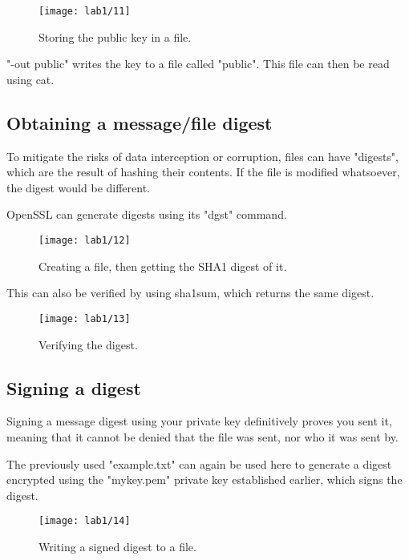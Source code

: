 \begin{figure}[H]
    \centering
    \texttt{[image: lab1/11]}
    \caption{Storing the public key in a file.}
    \label{fig:pubKeyFile}
\end{figure}

"-out public" writes the key to a file called "public".
This file can then be read using cat.

\pagebreak

\subsection{Obtaining a message/file digest}\label{subsec:hashDigest}
To mitigate the risks of data interception or corruption, files can have "digests", which are the result
of hashing their contents.
If the file is modified whatsoever, the digest would be different.\newline

OpenSSL can generate digests using its "dgst" command.
\begin{figure}[H]
    \centering
    \texttt{[image: lab1/12]}
    \caption{Creating a file, then getting the SHA1 digest of it.}
    \label{fig:digest}
\end{figure}

This can also be verified by using sha1sum, which returns the same digest.

\begin{figure}[H]
    \centering
    \texttt{[image: lab1/13]}
    \caption{Verifying the digest.}
    \label{fig:digestVerify}
\end{figure}

\pagebreak

\subsection{Signing a digest}\label{subsec:SignDigest}
Signing a message digest using your private key definitively proves you sent it,
meaning that it cannot be denied that the file was sent, nor who it was sent by.

The previously used "example.txt" can again be used here to generate a digest encrypted using the "mykey.pem"
private key established earlier, which signs the digest.

\begin{figure}[H]
    \centering
    \texttt{[image: lab1/14]}
    \caption{Writing a signed digest to a file.}
    \label{fig:writeDigest}
\end{figure}

